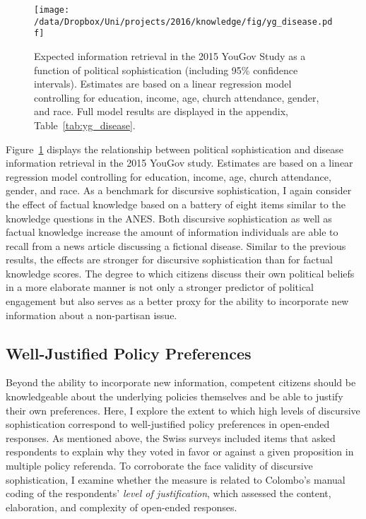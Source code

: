 \begin{figure}[h]\centering
\texttt{[image: /data/Dropbox/Uni/projects/2016/knowledge/fig/yg\_disease.pdf]}
\caption[Expected information retrieval in the 2015 YouGov Study as a function of political sophistication]{Expected information retrieval in the 2015 YouGov Study as a function of political sophistication (including 95\% confidence intervals). Estimates are based on a linear regression model controlling for education, income, age, church attendance, gender, and race. Full model results are displayed in the appendix, Table~\ref{tab:yg_disease}.}\label{fig:yg_disease}
\end{figure}

Figure~\ref{fig:yg_disease} displays the relationship between political sophistication and disease information retrieval in the 2015 YouGov study. Estimates are based on a linear regression model controlling for education, income, age, church attendance, gender, and race. As a benchmark for discursive sophistication, I again consider the effect of factual knowledge based on a battery of eight items similar to the knowledge questions in the ANES. Both discursive sophistication as well as factual knowledge increase the amount of information individuals are able to recall from a news article discussing a fictional disease. Similar to the previous results, the effects are stronger for discursive sophistication than for factual knowledge scores. The degree to which citizens discuss their own political beliefs in a more elaborate manner is not only a stronger predictor of political engagement but also serves as a better proxy for the ability to incorporate new information about a non-partisan issue.


\subsection*{Well-Justified Policy Preferences}
Beyond the ability to incorporate new information, competent citizens should be knowledgeable about the underlying policies themselves and be able to justify their own preferences. Here, I explore the extent to which high levels of discursive sophistication correspond to well-justified policy preferences in open-ended responses. As mentioned above, the Swiss surveys included items that asked respondents to explain why they voted in favor or against a given proposition in multiple policy referenda. To corroborate the face validity of discursive sophistication, I examine whether the measure is related to Colombo's \citeyearpar{colombo2016justifications} manual coding of the respondents' \textit{level of justification}, which assessed the content, elaboration, and complexity of open-ended responses.

